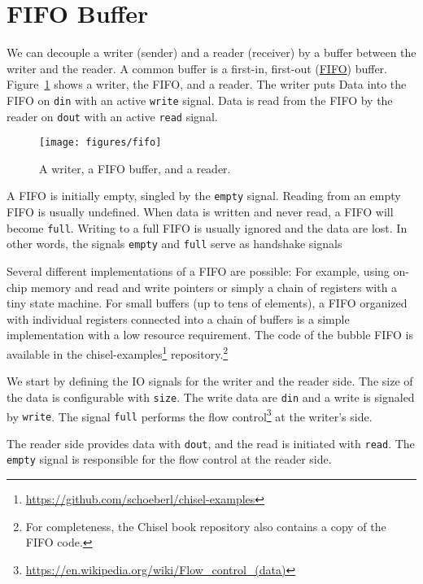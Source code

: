 \documentclass[%
    10pt,
    headinclude, footexclude,
    openright, %
    notitlepage,
    cleardoubleempty,
    headsepline,
    pointlessnumbers,
    bibtotoc, idxtotoc,
    ]{scrbook}
\newcommand{\scale}{0.7}
\newcommand{\code}[1]{{\lstinline[basicstyle=\small\ttfamily]{#1}}}
\newcommand{\myref}[2]{\href{#1}{#2}}
\renewcommand{\myref}[2]{{#2}{\footnote{\url{#1}}}}
\begin{document}
\section{FIFO Buffer}
\label{sec:fifo}



We can decouple a writer (sender) and a reader (receiver) by a buffer
between the writer and the reader.
A common buffer is a first-in, first-out
(\href{https://en.wikipedia.org/wiki/FIFO_%28computing_and_electronics%29}{FIFO})
buffer. Figure~\ref{fig:fifo} shows a writer, the FIFO, and a reader.
The writer puts Data into the FIFO on \code{din} with an active
\code{write} signal. Data is read from the FIFO by the reader on
\code{dout} with an active \code{read} signal.

\begin{figure}
  \centering
  \texttt{[image: figures/fifo]}
  \caption{A writer, a FIFO buffer, and a reader.}
  \label{fig:fifo}
\end{figure}

A FIFO is initially empty, singled by the \code{empty} signal. Reading
from an empty FIFO is usually undefined. When data is written and never
read, a FIFO will become \code{full}. Writing to a full FIFO is usually ignored
and the data are lost. In other words, the signals \code{empty} and \code{full}
serve as handshake signals

Several different implementations of a FIFO are possible: For example, using on-chip
memory and read and write pointers or simply a chain of registers with a
tiny state machine. For small buffers (up to tens of elements), a FIFO organized
with individual registers connected into a chain of buffers is a simple
implementation with a low resource requirement.
The code of the bubble FIFO is available in the
\myref{https://github.com/schoeberl/chisel-examples}{chisel-examples}
repository.\footnote{For completeness, the Chisel book repository also contains
a copy of the FIFO code.}

We start by defining the IO signals for the writer and the reader side.
The size of the data is configurable with \code{size}.
The write data are \code{din} and a write is signaled by \code{write}.
The signal \code{full} performs the
\myref{https://en.wikipedia.org/wiki/Flow_control_(data)}{flow control}
at the writer's side.


The reader side provides data with \code{dout}, and the read is initiated
with \code{read}. The \code{empty} signal is responsible for the flow control
at the reader side.
\end{document}
